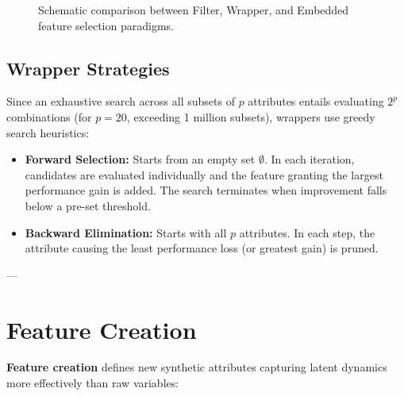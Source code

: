 \begin{figure}[H]
{%
}
\caption{Schematic comparison between Filter, Wrapper, and Embedded feature selection paradigms.}
\label{fig:feature-selection-methods}
\end{figure}

\subsection{Wrapper Strategies}
Since an exhaustive search across all subsets of $p$ attributes entails evaluating $2^p$ combinations (for $p=20$, exceeding 1 million subsets), wrappers use greedy search heuristics:
\begin{itemize}
    \item \textbf{Forward Selection:} Starts from an empty set $\emptyset$. In each iteration, candidates are evaluated individually and the feature granting the largest performance gain is added. The search terminates when improvement falls below a pre-set threshold.
    \item \textbf{Backward Elimination:} Starts with all $p$ attributes. In each step, the attribute causing the least performance loss (or greatest gain) is pruned.
\end{itemize}

---

\section{Feature Creation}

\textbf{Feature creation} defines new synthetic attributes capturing latent dynamics more effectively than raw variables:

